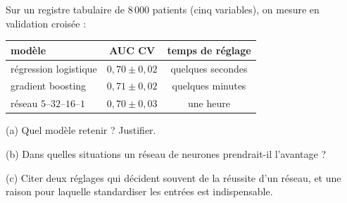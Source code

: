 \documentclass[10pt,a4paper]{article}
\newcommand{\repligne}{\par\vspace{0.42cm}\noindent\dotfill}
\begin{document}
Sur un registre tabulaire de $8\,000$ patients (cinq variables), on mesure en validation croisée :

\vspace{0.1cm}
{\small \renewcommand{\arraystretch}{1.5}\begin{tabular}{|l|c|c|}\hline
modèle & AUC CV & temps de réglage\\\hline
régression logistique & $0{,}70 \pm 0{,}02$ & quelques secondes\\\hline
gradient boosting & $0{,}71 \pm 0{,}02$ & quelques minutes\\\hline
réseau $5$--$32$--$16$--$1$ & $0{,}70 \pm 0{,}03$ & une heure\\\hline
\end{tabular}}

\vspace{0.2cm}
(a) Quel modèle retenir ? Justifier.
\repligne\repligne

\vspace{0.15cm}
(b) Dans quelles situations un réseau de neurones prendrait-il l'avantage ?
\repligne\repligne

\vspace{0.15cm}
(c) Citer deux réglages qui décident souvent de la réussite d'un réseau, et une raison pour laquelle standardiser les entrées est indispensable.
\repligne\repligne
\end{document}
